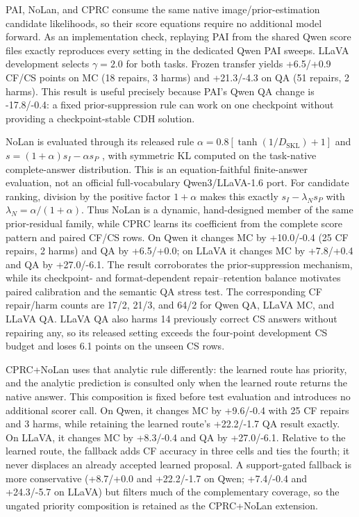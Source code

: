 \documentclass[letterpaper]{article}
\begin{document}
PAI, NoLan, and CPRC consume the same native image/prior-estimation candidate
likelihoods, so their score equations require no additional model forward. As an
implementation check, replaying PAI from the
shared Qwen score files exactly reproduces every setting in the dedicated Qwen
PAI sweeps. LLaVA development selects $\gamma=2.0$ for both tasks. Frozen
transfer yields +6.5/+0.9 CF/CS points on MC (18 repairs, 3 harms) and
+21.3/-4.3 on QA (51 repairs, 2 harms). This result is useful precisely because
PAI's Qwen QA change is -17.8/-0.4: a fixed prior-suppression rule can work on
one checkpoint without providing a checkpoint-stable CDH solution.

NoLan is evaluated through its released rule
$\alpha=0.8[\tanh(1/D_{\mathrm{SKL}})+1]$ and
$s=(1+\alpha)s_I-\alpha s_P$ \cite{ren2026nolan}, with symmetric KL computed on
the task-native complete-answer distribution. This is an equation-faithful
finite-answer evaluation, not an official full-vocabulary Qwen3/LLaVA-1.6 port.
For candidate ranking, division by the positive factor $1+\alpha$ makes this
exactly $s_I-\lambda_Ns_P$ with $\lambda_N=\alpha/(1+\alpha)$. Thus NoLan is a
dynamic, hand-designed member of the same prior-residual family, while CPRC
learns its coefficient from the complete score pattern and paired CF/CS rows.
On Qwen it changes MC by +10.0/-0.4 (25 CF repairs, 2 harms) and QA by
+6.5/+0.0; on LLaVA it changes MC by +7.8/+0.4 and QA by +27.0/-6.1. The result
corroborates the prior-suppression mechanism, while its checkpoint- and
format-dependent repair--retention balance motivates paired calibration and the
semantic QA stress test.
The corresponding CF repair/harm counts are 17/2, 21/3, and 64/2 for Qwen QA,
LLaVA MC, and LLaVA QA. LLaVA QA also harms 14 previously correct CS answers
without repairing any, so its released setting exceeds the four-point
development CS budget and loses 6.1 points on the unseen CS rows.

CPRC+NoLan uses that analytic rule differently: the learned route
has priority, and the analytic prediction is consulted only when the learned
route returns the native answer. This composition is fixed before test
evaluation and introduces no additional scorer call. On Qwen, it changes MC by
+9.6/-0.4 with 25 CF repairs and 3 harms, while retaining the learned route's
+22.2/-1.7 QA result exactly. On LLaVA, it changes MC by +8.3/-0.4 and QA by
+27.0/-6.1. Relative to the learned route, the fallback adds CF accuracy in
three cells and ties the fourth; it never displaces an already accepted learned
proposal. A support-gated fallback is more conservative (+8.7/+0.0 and
+22.2/-1.7 on Qwen; +7.4/-0.4 and +24.3/-5.7 on LLaVA) but filters much of the
complementary coverage, so the ungated priority composition is retained as the CPRC+NoLan
extension.
\end{document}
